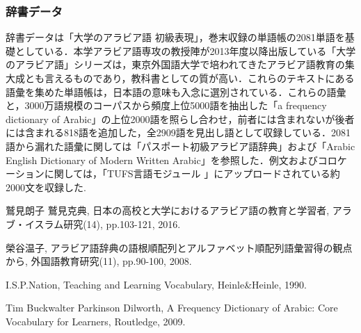\documentclass[technicalreport]{ieicej}
\begin{document}
\subsubsection{辞書データ}
辞書データは「大学のアラビア語 初級表現」，巻末収録の単語帳の2081単語を基礎としている．本学アラビア語専攻の教授陣が2013年度以降出版している「大学のアラビア語」シリーズは，東京外国語大学で培われてきたアラビア語教育の集大成とも言えるものであり，教科書としての質が高い．これらのテキストにある語彙を集めた単語帳は，日本語の意味も入念に選別されている．これらの語彙と，3000万語規模のコーパスから頻度上位5000語を抽出した「a frequency dictionary of Arabic」の上位2000語を照らし合わせ，前者には含まれないが後者には含まれる818語を追加した，全2909語を見出し語として収録している．2081語から漏れた語彙に関しては「パスポート初級アラビア語辞典」および「Arabic English Dictionary of Modern Written Arabic」を参照した．例文およびコロケーションに関しては，「TUFS言語モジュール 」にアップロードされている約2000文を収録した.

\begin{thebibliography}{99}
鷲見朗子 鷲見克典, 日本の高校と大学におけるアラビア語の教育と学習者, アラブ・イスラム研究(14), pp.103-121, 2016.

榮谷温子, アラビア語辞典の語根順配列とアルファベット順配列語彙習得の観点から, 外国語教育研究(11), pp.90-100, 2008.

I.S.P.Nation, Teaching and Learning Vocabulary, Heinle\&Heinle, 1990. 

Tim Buckwalter  Parkinson Dilworth, A Frequency Dictionary of Arabic: Core Vocabulary for Learners, Routledge, 2009.

\end{thebibliography}
\end{document}
